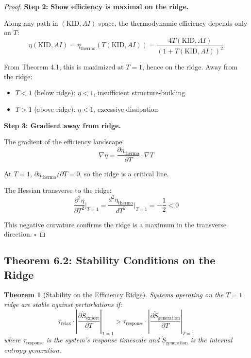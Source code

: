 \documentclass[11pt,a4paper]{article}
\newtheorem{theorem}{Theorem}[section]
\begin{document}
\begin{proof}
\textbf{Step 2: Show efficiency is maximal on the ridge.}

Along any path in $(\text{KID}, AI)$ space, the thermodynamic efficiency depends only on $T$:
\begin{equation}
\eta(\text{KID}, AI) = \eta_{\text{thermo}}(T(\text{KID}, AI)) = \frac{4T(\text{KID}, AI)}{(1 + T(\text{KID}, AI))^2}
\end{equation}

From Theorem 4.1, this is maximized at $T = 1$, hence on the ridge. Away from the ridge:
\begin{itemize}
\item $T < 1$ (below ridge): $\eta < 1$, insufficient structure-building
\item $T > 1$ (above ridge): $\eta < 1$, excessive dissipation
\end{itemize}

\textbf{Step 3: Gradient away from ridge.}

The gradient of the efficiency landscape:
\begin{equation}
\nabla \eta = \frac{\partial \eta_{\text{thermo}}}{\partial T} \cdot \nabla T
\end{equation}

At $T = 1$, $\partial \eta_{\text{thermo}}/\partial T = 0$, so the ridge is a critical line.

The Hessian transverse to the ridge:
\begin{equation}
\frac{\partial^2 \eta}{\partial T^2}\bigg|_{T=1} = \frac{d^2 \eta_{\text{thermo}}}{dT^2}\bigg|_{T=1} = -\frac{1}{2} < 0
\end{equation}

This negative curvature confirms the ridge is a maximum in the transverse direction.
\hfill $\square$
\end{proof}

\subsection{Theorem 6.2: Stability Conditions on the Ridge}

\begin{theorem}[Stability on the Efficiency Ridge]
Systems operating on the $T = 1$ ridge are stable against perturbations if:
\begin{equation}
\tau_{\text{relax}} \cdot \left|\frac{\partial \dot{S}_{\text{export}}}{\partial T}\right|_{T=1} > \tau_{\text{response}} \cdot \left|\frac{\partial \dot{S}_{\text{generation}}}{\partial T}\right|_{T=1}
\end{equation}
where $\tau_{\text{response}}$ is the system's response timescale and $\dot{S}_{\text{generation}}$ is the internal entropy generation.
\end{theorem}
\end{document}
